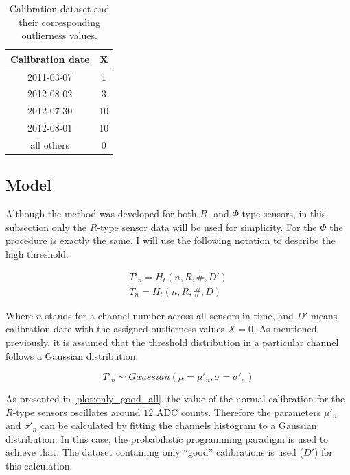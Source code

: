 \begin{table}[h]

\begin{center}
\begin{tabular}{ |c|c| }
\hline
Calibration date& X\\
\hline
2011-03-07&1\\
2012-08-02&3\\
2012-07-30&10\\
2012-08-01&10\\
all others&0\\
\hline
\end{tabular}
\end{center}
\caption{\label{data-table} Calibration dataset and their corresponding outlierness values.}
\end{table}

\subsection{Model}

Although the method was developed for both $R$- and $\Phi$-type sensors, in this subsection only the $R$-type sensor data will be used for simplicity. For the $\Phi$ the procedure is exactly the same. I will use the following notation to describe the high threshold:


\begin{align}
  T\prime_n = H_{t}(n, R, \#, D\prime) \\
  T_n = H_{t}(n, R, \#, D)
  \label{eq:notation}
  \end{align}

  Where $n$ stands for a channel number across all sensors in time, and $D\prime$ means calibration date with the assigned outlierness values $X=0$.
As mentioned previously, it is assumed that the threshold distribution in a particular channel follows a Gaussian distribution.

\begin{equation}
    T\prime_n \sim Gaussian(\mu=\mu\prime_n, \sigma=\sigma\prime_n)
  \label{eq:basic-model}
  \end{equation}

As presented in \ref{plot:only_good_all}, the value of the normal calibration for the $R$-type sensors oscillates around $12$ ADC counts.
Therefore the parameters $\mu\prime_{n}$ and $\sigma\prime_{n}$ can be calculated by fitting the channels histogram to a Gaussian distribution.
In this case, the probabilistic programming paradigm is used to achieve that. The dataset containing only ``good'' calibrations is used ($D\prime$) for this calculation.

